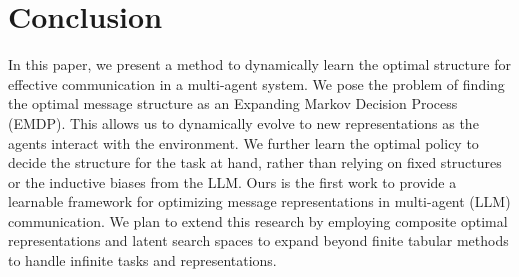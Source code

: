 \section{Conclusion}
In this paper, we present a method to dynamically learn the optimal structure for effective communication in a multi-agent system. We pose the problem of finding the optimal message structure as an Expanding Markov Decision Process (EMDP). This allows us to dynamically evolve to new representations as the agents interact with the environment. We further learn the optimal policy to decide the structure for the task at hand, rather than relying on fixed structures or the inductive biases from the LLM. Ours is the first work to provide a learnable framework for optimizing message representations in multi-agent (LLM) communication. 
We plan to extend this research by employing composite optimal representations and latent search spaces to expand beyond finite tabular methods to handle infinite tasks and representations.

